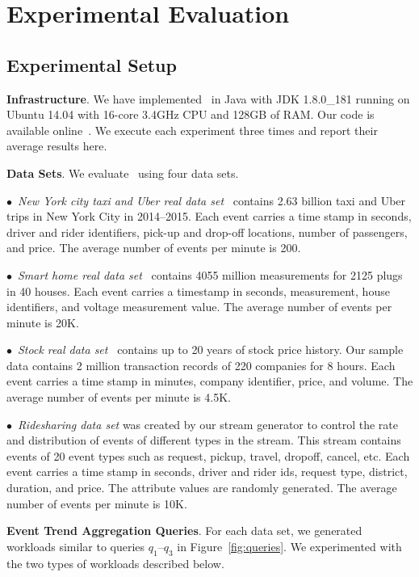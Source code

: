 \section{Experimental Evaluation}
\label{sec:experiments}

\subsection{Experimental Setup}

\textbf{Infrastructure}.
%
We have implemented \app\ in Java with JDK 1.8.0\_181 running on Ubuntu 14.04 with 16-core 3.4GHz CPU and 128GB of RAM. Our code is available online~\cite{hamlet_code}. We execute each experiment three times and report their average results here.

\textbf{Data Sets}. 
%
We evaluate \app\ using four data sets.

$\bullet$~\textit{New York city taxi and Uber real data set}~\cite{uber1} contains 2.63 billion taxi and Uber trips in New York City in 2014--2015. Each event carries a time stamp in seconds, driver and rider identifiers, pick-up and drop-off locations, number of passengers, and price. The average number of events per minute is 200.

$\bullet$~\textit{Smart home real data set}~\cite{smarthome} contains 4055 million measurements for 2125 plugs in 40 houses. Each event carries a timestamp in seconds, measurement, house identifiers, and voltage measurement value. The average number of events per minute is 20K.

$\bullet$~\textit{Stock real data set}~\cite{stockStream} contains up to 20 years of stock price history. Our sample data contains 2 million transaction records of 220 companies for 8 hours. Each event carries a time stamp in minutes, company identifier, price, and volume. The average number of events per minute is 4.5K.

$\bullet$~\textit{Ridesharing data set} was created by our stream generator to control the rate and distribution of events of different types in the stream. This stream contains events of 20 event types such as request, pickup, travel, dropoff, cancel, etc. Each event carries a time stamp in seconds, driver and rider ids, request type, district, duration, and price. The attribute values are randomly generated. The average number of events per minute is 10K.

\textbf{Event Trend Aggregation Queries}.
%
For each data set, we generated workloads similar to queries $q_1$--$q_3$ in Figure~\ref{fig:queries}. We experimented with the  two types of workloads described below.

